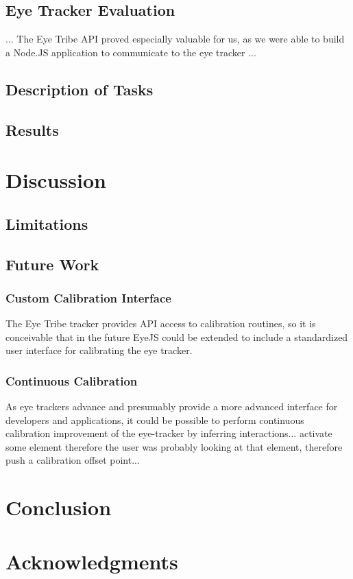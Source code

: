 \documentclass{sigchi}
\begin{document}
\subsection{Eye Tracker Evaluation}
... The Eye Tribe API proved especially valuable for us, as we were
able to build a Node.JS application to communicate to the eye tracker
...

\subsection{Description of Tasks}

\subsection{Results}

\section{Discussion}

\subsection{Limitations}

\subsection{Future Work}

\subsubsection{Custom Calibration Interface}
The Eye Tribe tracker provides API access to calibration routines, so
it is conceivable that in the future EyeJS could be extended to include
a standardized user interface for calibrating the eye tracker.

\subsubsection{Continuous Calibration}
As eye trackers advance and presumably provide a more advanced interface
for developers and applications, it could be possible to perform
continuous calibration improvement of the eye-tracker by inferring
interactions... activate some element therefore the user was probably
looking at that element, therefore push a calibration offset point...

\section{Conclusion}

\section{Acknowledgments}

\balance{}



\end{document}
